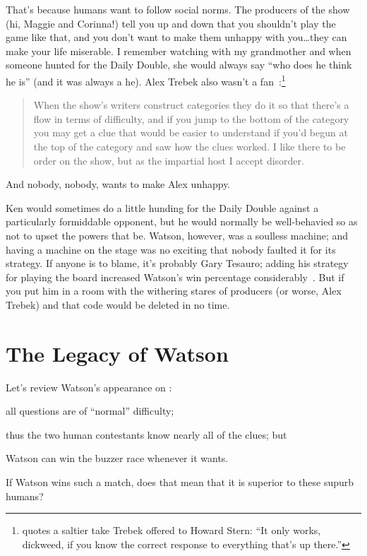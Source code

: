 That's because humans want to follow social norms.
%
The producers of the show (hi, Maggie and Corinna!) tell you up and
down that you shouldn't play the game like that, and you don't want to
make them unhappy with you\dots they can make your life miserable.
%
I remember watching \jeopardy{} with my grandmother and when someone
hunted for the Daily Double, she would always say ``who does he think
he is'' (and it was always a he).
%
Alex Trebek also wasn't a
fan~\citep{marchese-18}:\footnote{\citet{rogak-20} quotes a saltier
  take Trebek offered to Howard Stern: ``It only works, dickweed, if
  you know the correct response to everything that's up there.''}
%
\begin{quote}
  When the show's writers construct categories they do it so that
  there's a flow in terms of difficulty, and if you jump to the bottom
  of the category you may get a clue that would be easier to
  understand if you'd begun at the top of the category and saw how the
  clues worked. I like there to be order on the show, but as the
  impartial host I accept disorder.
\end{quote}
%
And nobody, nobody, wants to make Alex unhappy.

Ken would sometimes do a little hunding for the Daily Double against a
particularly formiddable opponent, but he would normally be
well-behavied so as not to upset the powers that be.
%
Watson, however, was a soulless machine; and having a machine on the
stage was no exciting that
nobody faulted it for its strategy.
%
If anyone is to blame, it's probably Gary Tesauro; adding his
strategy for playing the board increased Watson's win percentage
considerably~\citep{tesauro-13}.
%
But if you put him in a room with the withering stares of \jeopardy{}
producers (or worse, Alex Trebek) and that code would be deleted in no
time.


\section{The Legacy of Watson}


Let's review Watson's appearance on \jeopardyp{}:
\begin{enumerate*}
        \item all questions are of ``normal'' difficulty;
        \item thus the two human contestants know nearly all of the clues; but
        \item Watson can win the buzzer race whenever it wants.
\end{enumerate*}
If Watson wins such a match, does that mean that it is superior to
these supurb humans?

